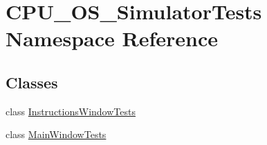 \hypertarget{namespace_c_p_u___o_s___simulator_tests}{}\section{C\+P\+U\+\_\+\+O\+S\+\_\+\+Simulator\+Tests Namespace Reference}
\label{namespace_c_p_u___o_s___simulator_tests}
\subsection*{Classes}
\begin{DoxyCompactItemize}
\item 
class \hyperlink{class_c_p_u___o_s___simulator_tests_1_1_instructions_window_tests}{Instructions\+Window\+Tests}
\item 
class \hyperlink{class_c_p_u___o_s___simulator_tests_1_1_main_window_tests}{Main\+Window\+Tests}
\end{DoxyCompactItemize}

